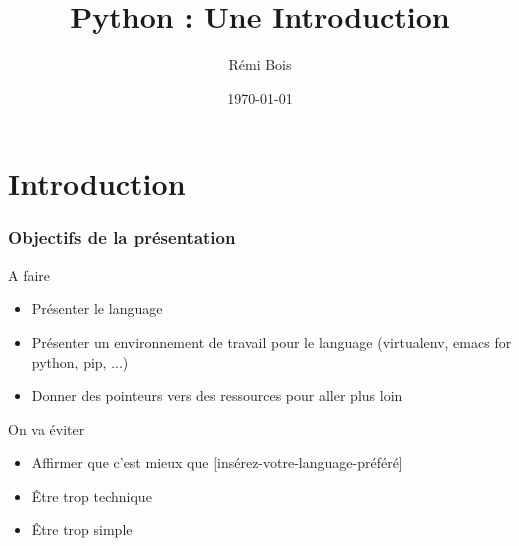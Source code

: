 \documentclass{beamer}
\title{Python : Une Introduction}
\institute{ASCII}
\author{Rémi Bois}
\date{\today}
\begin{document}
\begin{frame}
  \maketitle
\end{frame}

\section{Introduction}
\label{sec:intro}


\begin{frame}
  \frametitle{Objectifs de la présentation}

  \begin{block}{A faire}
    \begin{itemize}
    \item Présenter le language
    \item Présenter un environnement de travail pour le language
      (virtualenv, emacs for python, pip, ...)
    \item Donner des pointeurs vers des ressources pour aller plus loin
    \end{itemize}
  \end{block}

  \begin{block}{On va éviter}
    \begin{itemize}
    \item Affirmer que c'est mieux que
      [insérez-votre-language-préféré]

    \item Être trop technique
    \item Être trop simple
    \end{itemize}
  \end{block}
  
\end{frame}
\end{document}
